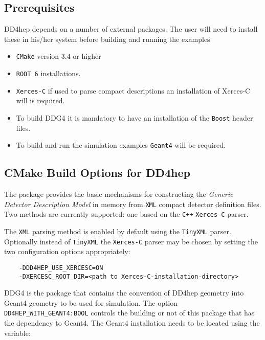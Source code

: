\subsection{Prerequisites}
\label{sec:dd4hep-user-manual-prerequisites}

DD4hep depends on a number of external packages. The user will need to install these in his/her system before building and running the examples
\begin{itemize}
\item \texttt{CMake} version 3.4 or higher 
\item \texttt{ROOT 6} installations.
\item \texttt{Xerces-C} if used to parse compact descriptions an installation of {Xerces-C} will is required.
\item To build DDG4 it is mandatory to have an installation of the \texttt{Boost} header files.
\item To build and run the simulation examples \texttt{Geant4} will be required. 
\end{itemize}

\subsection{CMake Build Options for DD4hep}
\label{sec:dd4hep-user-manual-building}

The package provides the basic mechanisms for constructing the \textit{Generic Detector Description Model} in memory from \texttt{XML} compact detector definition files. Two methods are currently supported: one based
on the \texttt{C++} \texttt{Xerces-C} parser.

The \texttt{XML} parsing method is enabled by default using the \texttt{TinyXML} parser. Optionally instead of \texttt{TinyXML} the \texttt{Xerces-C}  parser may be chosen by setting the two configuration options appropriately:

\begin{verbatim}
    -DDD4HEP_USE_XERCESC=ON
    -DXERCESC_ROOT_DIR=<path to Xerces-C-installation-directory>
\end{verbatim}

DDG4 is the package that contains the conversion of DD4hep geometry into Geant4 geometry to be used for simulation. The option \texttt{DD4HEP\_WITH\_GEANT4:BOOL} controls the building or not of this package that has the dependency to Geant4. The Geant4 installation needs to be located using the variable:

